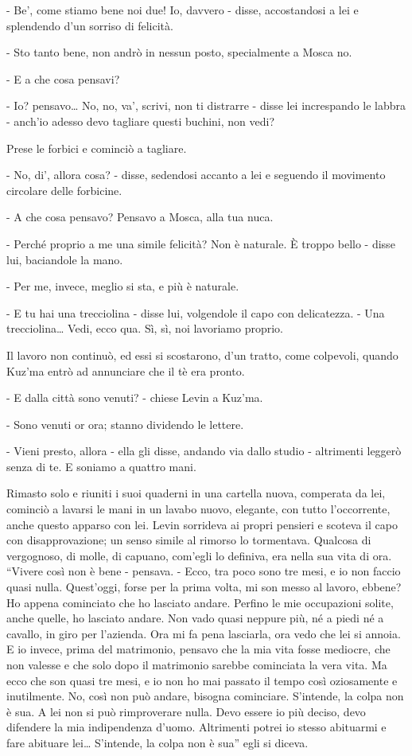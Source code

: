 - Be', come stiamo bene noi due! Io, davvero - disse, accostandosi a lei e splendendo d'un sorriso di felicità. 

- Sto tanto bene, non andrò in nessun posto, specialmente a Mosca no. 

- E a che cosa pensavi? 

- Io? pensavo\ldots{} No, no, va', scrivi, non ti distrarre - disse lei increspando le labbra - anch'io adesso devo tagliare questi buchini, non vedi? 

Prese le forbici e cominciò a tagliare. 

- No, di', allora cosa? - disse, sedendosi accanto a lei e seguendo il movimento circolare delle forbicine. 

- A che cosa pensavo? Pensavo a Mosca, alla tua nuca. 

- Perché proprio a me una simile felicità? Non è naturale. È troppo bello - disse lui, baciandole la mano. 

- Per me, invece, meglio si sta, e più è naturale. 

- E tu hai una trecciolina - disse lui, volgendole il capo con delicatezza. - Una trecciolina\ldots{} Vedi, ecco qua. Sì, sì, noi lavoriamo proprio. 

Il lavoro non continuò, ed essi si scostarono, d'un tratto, come colpevoli, quando Kuz'ma entrò ad annunciare che il tè era pronto. 

- E dalla città sono venuti? - chiese Levin a Kuz'ma. 

- Sono venuti or ora; stanno dividendo le lettere. 

- Vieni presto, allora - ella gli disse, andando via dallo studio - altrimenti leggerò senza di te. E soniamo a quattro mani. 

Rimasto solo e riuniti i suoi quaderni in una cartella nuova, comperata da lei, cominciò a lavarsi le mani in un lavabo nuovo, elegante, con tutto l'occorrente, anche questo apparso con lei. Levin sorrideva ai propri pensieri e scoteva il capo con disapprovazione; un senso simile al rimorso lo tormentava. Qualcosa di vergognoso, di molle, di capuano, com'egli lo definiva, era nella sua vita di ora. ``Vivere così non è bene - pensava. - Ecco, tra poco sono tre mesi, e io non faccio quasi nulla. Quest'oggi, forse per la prima volta, mi son messo al lavoro, ebbene? Ho appena cominciato che ho lasciato andare. Perfino le mie occupazioni solite, anche quelle, ho lasciato andare. Non vado quasi neppure più, né a piedi né a cavallo, in giro per l'azienda. Ora mi fa pena lasciarla, ora vedo che lei si annoia. E io invece, prima del matrimonio, pensavo che la mia vita fosse mediocre, che non valesse e che solo dopo il matrimonio sarebbe cominciata la vera vita. Ma ecco che son quasi tre mesi, e io non ho mai passato il tempo così oziosamente e inutilmente. No, così non può andare, bisogna cominciare. S'intende, la colpa non è sua. A lei non si può rimproverare nulla. Devo essere io più deciso, devo difendere la mia indipendenza d'uomo. Altrimenti potrei io stesso abituarmi e fare abituare lei\ldots{} S'intende, la colpa non è sua'' egli si diceva. 

